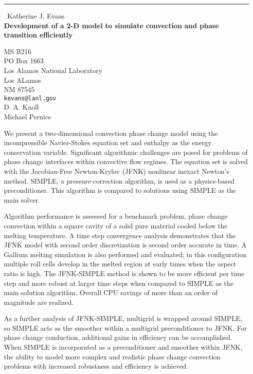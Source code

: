 \documentclass{report}
\begin{document}
\begin{center}
\rule{6in}{1pt} \
{\large Katherine J. Evans \\
{\bf Development of a 2-D model to simulate convection and phase transition efficiently}}

MS B216 \\ PO Box 1663 \\ Los Alamos National Laboratory \\ Los ALamos \\ NM 87545
\\
{\tt kevans@lanl.gov}\\
D. A. Knoll\\
Michael Pernice \end{center}

We present a two-dimensional convection phase change model using the
incompressible Navier-Stokes equation set and enthalpy as the energy
conservation variable. Significant algorithmic challenges are posed for
problems of phase change interfaces within convective flow regimes. The
equation set is solved with the Jacobian-Free Newton-Krylov (JFNK)
nonlinear inexact Newton's method. SIMPLE, a pressure-correction
algorithm, is used as a physics-based preconditioner. This algorithm is
compared to solutions using SIMPLE as the main solver.

Algorithm performance is assessed for a benchmark problem, phase change
convection within a square cavity of a solid pure material cooled below
the melting temperature. A time step convergence analysis demonstrates
that the JFNK model with second order discretization is second order
accurate in time. A Gallium melting simulation is also performed and
evaluated; in this configuration multiple roll cells develop in the
melted region at early times when the aspect ratio is high. The
JFNK-SIMPLE method is shown to be more efficient per time step and more
robust at larger
time steps when compared to SIMPLE as the main solution algorithm.
Overall CPU savings of more than an order of magnitude are realized.

As a further analysis of JFNK-SIMPLE, multigrid is wrapped around SIMPLE,
so SIMPLE acts as the smoother within a multigrid preconditioner to JFNK.
For phase change conduction, additional gains in efficiency can be
accomplished. When SIMPLE is incorporated as a preconditioner and
smoother within JFNK, the ability to model more
complex and realistic phase change convection problems with increased
robustness and efficiency is achieved.
\end{document}
